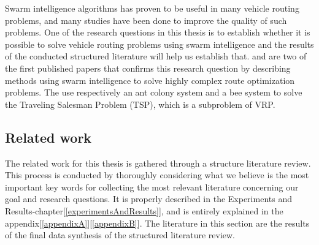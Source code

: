 Swarm intelligence algorithms has proven to be useful in many vehicle routing problems, and many studies have been done to improve the quality of such problems. One of the research questions in this thesis is to establish whether it is possible to  solve vehicle routing problems using swarm intelligence and the results of the conducted structured literature will help us establish that. \citet{dorigo97} and \citet{lucic03} are two of the first published papers that confirms this research question by describing methods using swarm intelligence to solve highly complex route optimization problems. The use respectively an ant colony system and a bee system to solve the Traveling Salesman Problem (TSP), which is a subproblem of VRP.

\subsection{Related work}
The related work for this thesis is gathered through a structure literature review. This process is conducted by thoroughly considering what we believe is the most important key words for collecting the most relevant literature concerning our goal and research questions. It is properly described in the Experiments and Results-chapter[\ref{experimentsAndResults}], and is entirely explained in the appendix[\ref{appendixA}][\ref{appendixB}]. The literature in this section are the results of the final data synthesis of the structured literature review. 


